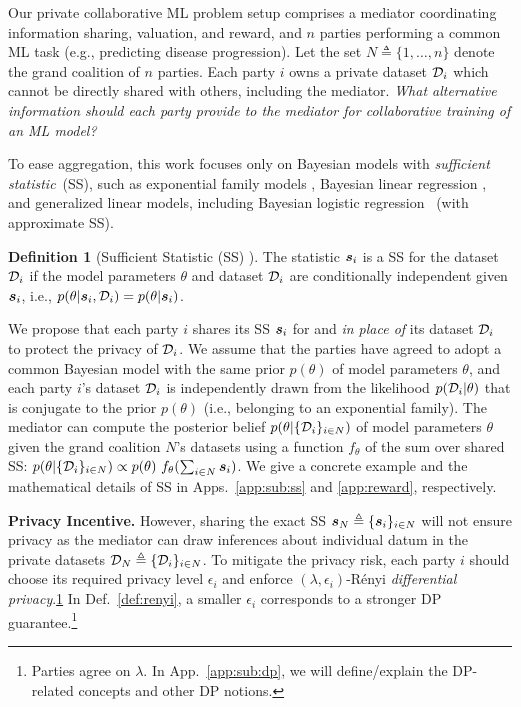 \documentclass{article}
\DeclareRobustCommand{\hlp}[1]
{{#1}}
\theoremstyle{plain}
\theoremstyle{definition}
\newtheorem{definition}[theorem]{Definition}
\theoremstyle{remark}
\renewcommand{\citet}[1]{\cite{#1}}
\begin{document}
Our private collaborative ML problem setup comprises a mediator coordinating information sharing, valuation, and  reward, and $n$ parties 
performing a common ML task (e.g., predicting disease progression). Let the set $N \triangleq \{1,\ldots,n\}$ denote the grand coalition of $n$ parties.
Each party $i$ owns a private dataset ${\mathcal{D}}_i$ which cannot be directly shared with others, including the mediator. \emph{What alternative information should each party provide to the mediator for collaborative training of an ML model?}

To ease aggregation, this work focuses only on Bayesian models with \emph{sufficient statistic}~(SS), %
such as exponential family models \cite{bishop2006pattern}, Bayesian linear regression \cite{murphy2022probabilistic}, and generalized linear models, including Bayesian logistic regression~\citet{huggins2017pass} (with approximate SS).\vspace{0.5mm}

\begin{definition}[Sufficient Statistic (SS) \cite{ss_def,titsias2009variational}]
    The statistic ${\bm{s}}_i$ is a SS for the dataset ${\mathcal{D}}_i$ if the model parameters $\theta$ and dataset ${\mathcal{D}}_i$ are conditionally independent given ${\bm{s}}_i$, i.e., ${p(\theta | {\bm{s}}_i, 
{\mathcal{D}}_i) = p(\theta | {\bm{s}}_i)}$. 
\end{definition}

We propose that each party $i$ shares its SS ${\bm{s}}_i$ for and \emph{in place of} its dataset ${\mathcal{D}}_i$ to protect the privacy of ${\mathcal{D}}_i$. 
We assume that the parties have agreed to adopt a common Bayesian model with the same prior $p(\theta)$ of model parameters $\theta$, and each party $i$'s dataset ${\mathcal{D}}_i$ is independently drawn from the likelihood $p({\mathcal{D}}_i | \theta)$ that is conjugate to the prior $p(\theta)$ (i.e., belonging to an exponential family).
The mediator can compute the posterior belief $p(\theta | \{{\mathcal{D}}_i\}_{i \in N})$ of model parameters $\theta$ given  
the grand coalition $N$'s datasets 
using a function $f_\theta$ of the sum over shared SS: $p(\theta | \{{\mathcal{D}}_i\}_{i \in N}) \propto p(\theta)\ f_\theta(\sum_{i \in N} {\bm{s}}_i)$. 
We give a concrete example and the mathematical details of SS in Apps.~\ref{app:sub:ss} and \ref{app:reward}, respectively. 

\textbf{Privacy Incentive.} However, sharing the exact SS ${\bm{s}}_N \triangleq \{{\bm{s}}_i\}_{i \in N}$ will not ensure privacy as the mediator can draw inferences about individual datum in the private datasets ${\mathcal{D}}_N \triangleq \{{\mathcal{D}}_i\}_{i \in N}$.
To mitigate the privacy risk, each party $i$ should choose its required privacy level $\epsilon_i$ and enforce $(\lambda, \epsilon_i)$-R{\'e}nyi \emph{differential privacy}.\cref{creep}
In Def.~\ref{def:renyi}, a smaller $\epsilon_i$ corresponds to a stronger DP guarantee.\footnote{\label{creep}Parties agree on $\lambda$. In App.~\ref{app:sub:dp}, \hlp{we will define/explain the DP-related concepts} 
and other DP notions.}\vspace{0.5mm}
\end{document}
